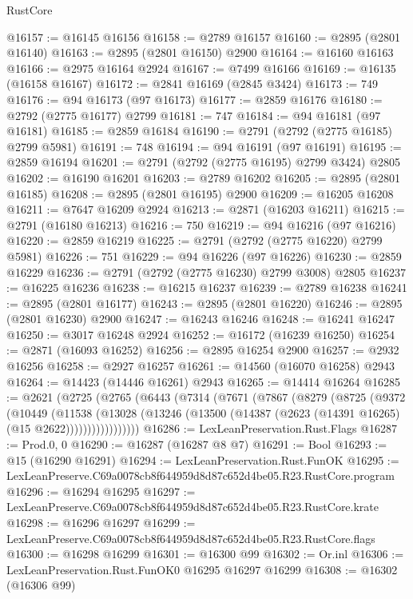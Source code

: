 \begin{lexlean}{RustCore}
\begin{coremodule}
@16157 := @16145 @16156
@16158 := @2789 @16157
@16160 := @2895 (@2801 @16140)
@16163 := @2895 (@2801 @16150) @2900
@16164 := @16160 @16163
@16166 := @2975 @16164 @2924
@16167 := @7499 @16166
@16169 := @16135 (@16158 @16167)
@16172 := @2841 @16169 (@2845 @3424)
@16173 := 749
@16176 := @94 @16173 (@97 @16173)
@16177 := @2859 @16176
@16180 := @2792 (@2775 @16177) @2799
@16181 := 747
@16184 := @94 @16181 (@97 @16181)
@16185 := @2859 @16184
@16190 := @2791 (@2792 (@2775 @16185) @2799 @5981)
@16191 := 748
@16194 := @94 @16191 (@97 @16191)
@16195 := @2859 @16194
@16201 := @2791 (@2792 (@2775 @16195) @2799 @3424) @2805
@16202 := @16190 @16201
@16203 := @2789 @16202
@16205 := @2895 (@2801 @16185)
@16208 := @2895 (@2801 @16195) @2900
@16209 := @16205 @16208
@16211 := @7647 @16209 @2924
@16213 := @2871 (@16203 @16211)
@16215 := @2791 (@16180 @16213)
@16216 := 750
@16219 := @94 @16216 (@97 @16216)
@16220 := @2859 @16219
@16225 := @2791 (@2792 (@2775 @16220) @2799 @5981)
@16226 := 751
@16229 := @94 @16226 (@97 @16226)
@16230 := @2859 @16229
@16236 := @2791 (@2792 (@2775 @16230) @2799 @3008) @2805
@16237 := @16225 @16236
@16238 := @16215 @16237
@16239 := @2789 @16238
@16241 := @2895 (@2801 @16177)
@16243 := @2895 (@2801 @16220)
@16246 := @2895 (@2801 @16230) @2900
@16247 := @16243 @16246
@16248 := @16241 @16247
@16250 := @3017 @16248 @2924
@16252 := @16172 (@16239 @16250)
@16254 := @2871 (@16093 @16252)
@16256 := @2895 @16254 @2900
@16257 := @2932 @16256
@16258 := @2927 @16257
@16261 := @14560 (@16070 @16258) @2943
@16264 := @14423 (@14446 @16261) @2943
@16265 := @14414 @16264
@16285 := @2621
    (@2725
      (@2765
        (@6443
          (@7314
            (@7671
              (@7867
                (@8279
                  (@8725
                    (@9372
                      (@10449
                        (@11538
                          (@13028
                            (@13246
                              (@13500 (@14387 (@2623 (@14391 @16265) (@15 @2622)))))))))))))))))
@16286 := LexLeanPreservation.Rust.Flags
@16287 := Prod.{0, 0}
@16290 := @16287 (@16287 @8 @7)
@16291 := Bool
@16293 := @15 (@16290 @16291)
@16294 := LexLeanPreservation.Rust.FunOK
@16295 := LexLeanPreserve.C69a0078cb8f644959d8d87c652d4be05.R23.RustCore.program
@16296 := @16294 @16295
@16297 := LexLeanPreserve.C69a0078cb8f644959d8d87c652d4be05.R23.RustCore.krate
@16298 := @16296 @16297
@16299 := LexLeanPreserve.C69a0078cb8f644959d8d87c652d4be05.R23.RustCore.flags
@16300 := @16298 @16299
@16301 := @16300 @99
@16302 := Or.inl
@16306 := LexLeanPreservation.Rust.FunOK0 @16295 @16297 @16299
@16308 := @16302 (@16306 @99)

\end{coremodule}
\end{lexlean}
